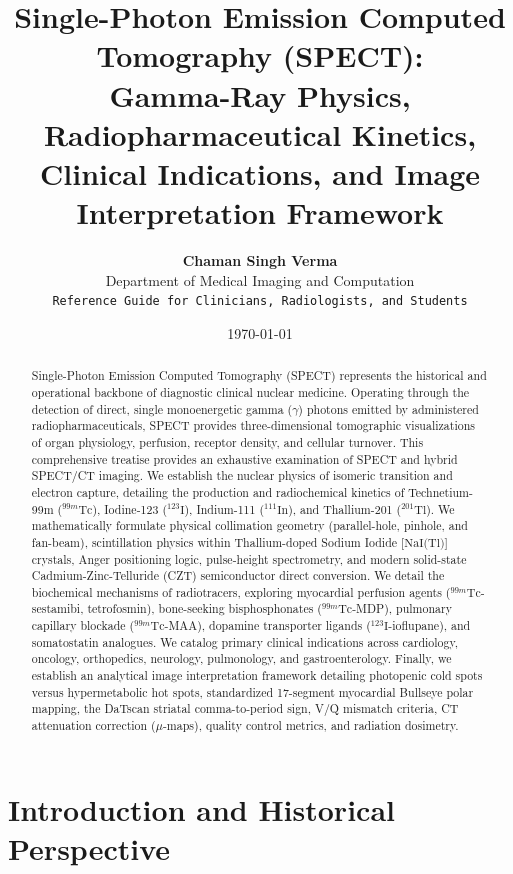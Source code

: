 \documentclass[11pt,a4paper]{article}
\title{\textbf{\huge Single-Photon Emission Computed Tomography (SPECT):}\\[0.3em]
\Large Gamma-Ray Physics, Radiopharmaceutical Kinetics,\\
Clinical Indications, and Image Interpretation Framework}
\author{\textbf{Chaman Singh Verma}\\[0.2em]
\small Department of Medical Imaging and Computation\\
\small \texttt{Reference Guide for Clinicians, Radiologists, and Students}}
\date{\today}
\begin{document}
\maketitle

\begin{abstract}
Single-Photon Emission Computed Tomography (SPECT) represents the historical and operational backbone of diagnostic clinical nuclear medicine. Operating through the detection of direct, single monoenergetic gamma ($\gamma$) photons emitted by administered radiopharmaceuticals, SPECT provides three-dimensional tomographic visualizations of organ physiology, perfusion, receptor density, and cellular turnover. This comprehensive treatise provides an exhaustive examination of SPECT and hybrid SPECT/CT imaging. We establish the nuclear physics of isomeric transition and electron capture, detailing the production and radiochemical kinetics of Technetium-99m ($^{99m}\text{Tc}$), Iodine-123 ($^{123}\text{I}$), Indium-111 ($^{111}\text{In}$), and Thallium-201 ($^{201}\text{Tl}$). We mathematically formulate physical collimation geometry (parallel-hole, pinhole, and fan-beam), scintillation physics within Thallium-doped Sodium Iodide [$\text{NaI(Tl)}$] crystals, Anger positioning logic, pulse-height spectrometry, and modern solid-state Cadmium-Zinc-Telluride (CZT) semiconductor direct conversion. We detail the biochemical mechanisms of radiotracers, exploring myocardial perfusion agents ($^{99m}\text{Tc}$-sestamibi, tetrofosmin), bone-seeking bisphosphonates ($^{99m}\text{Tc}$-MDP), pulmonary capillary blockade ($^{99m}\text{Tc}$-MAA), dopamine transporter ligands ($^{123}\text{I}$-ioflupane), and somatostatin analogues. We catalog primary clinical indications across cardiology, oncology, orthopedics, neurology, pulmonology, and gastroenterology. Finally, we establish an analytical image interpretation framework detailing photopenic cold spots versus hypermetabolic hot spots, standardized 17-segment myocardial Bullseye polar mapping, the DaTscan striatal comma-to-period sign, V/Q mismatch criteria, CT attenuation correction ($\mu$-maps), quality control metrics, and radiation dosimetry.
\end{abstract}

\tableofcontents
\newpage

\section{Introduction and Historical Perspective}
\end{document}
